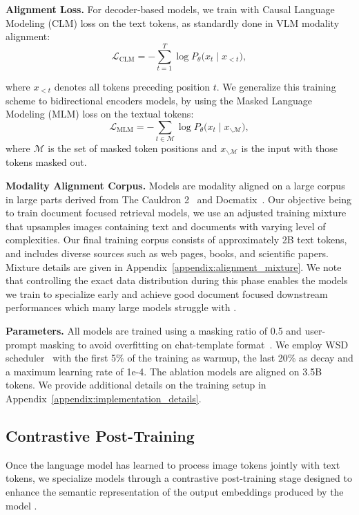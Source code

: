 \noindent\textbf{Alignment Loss.} 
For decoder‑based models, we train with Causal Language Modeling (CLM) loss on the text tokens, as standardly done in VLM modality alignment:
\begin{equation}
\mathcal{L}_{\text{CLM}}
  = -\sum_{t=1}^{T} \log P_{\theta}\!\bigl(x_t \mid x_{<t}\bigr),
\end{equation}

where $x_{<t}$ denotes all tokens preceding position $t$. We generalize this training scheme to bidirectional encoders models, by using the Masked Language Modeling (MLM) loss on the textual tokens:
\begin{equation}
\mathcal{L}_{\text{MLM}}
  = -\sum_{t \in \mathcal{M}} \log P_{\theta}\!\bigl(x_t \mid x_{\backslash\mathcal{M}}\bigr),
\end{equation}
where $\mathcal{M}$ is the set of masked token positions and
$x_{\backslash\mathcal{M}}$ is the input with those tokens masked out.


\noindent\textbf{Modality Alignment Corpus.} Models are modality aligned on a large corpus in large parts derived from The Cauldron 2~ and Docmatix~. Our objective being to train document focused retrieval models, we use an adjusted training mixture that upsamples images containing text and documents with varying level of complexities. Our final training corpus consists of approximately 2B text tokens, and includes diverse sources such as web pages, books, and scientific papers. Mixture details are given in Appendix~\ref{appendix:alignment_mixture}. We note that controlling the exact data distribution during this phase enables the models we train to specialize early and achieve good document focused downstream performances which many large models struggle with .

\noindent\textbf{Parameters.} All models are trained using a masking ratio of 0.5 and user-prompt masking to avoid overfitting on chat-template format~. We employ WSD scheduler~ with the first 5\% of the training as warmup, the last 20\% as decay and a maximum learning rate of 1e-4. The ablation models are aligned on 3.5B tokens. We provide additional details on the training setup in Appendix~\ref{appendix:implementation_details}.

\subsection{Contrastive Post-Training}
\label{sec:contrastive_posttraining}
Once the language model has learned to process image tokens jointly with text tokens, we specialize models through a contrastive post-training stage designed to enhance the semantic representation of the output embeddings produced by the model . 

